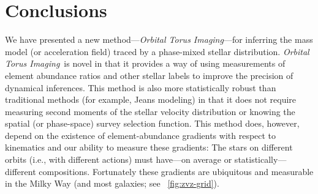 \documentclass[modern]{aastex63}
\newcommand{\methodname}{\textsl{Orbital Torus Imaging}}
\begin{document}



\section{Conclusions}
\label{sec:conclusions}

We have presented a new method---\methodname---for inferring the mass model (or
acceleration field) traced by a phase-mixed stellar distribution.
\methodname\ is novel in that it provides a way of using measurements of element
abundance ratios and other stellar labels to improve the precision of dynamical
inferences.
This method is also more statistically robust than traditional methods (for
example, Jeans modeling) in that it does not require measuring second moments of
the stellar velocity distribution or knowing the spatial (or phase-space) survey
selection function.
This method does, however, depend on the existence of element-abundance
gradients with respect to kinematics and our ability to measure these gradients:
The stars on different orbits (i.e., with different actions) must have---on
average or statistically---different compositions.
Fortunately these gradients are ubiquitous and measurable in the Milky Way (and
most galaxies; see \figurename~\ref{fig:zvz-grid}).
\end{document}
